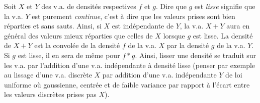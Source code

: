 \begin{eur}[Convolution des densités = addition d'un bruit indépendant sur la v.a.]
  Soit $X$ et $Y$ des v.a. de densités respectives $f$ et $g$.  Dire que $g$
  est \emph{lisse} signifie que la v.a. $Y$ est purement \emph{continue},
  c'est à dire que les valeurs prises sont bien réparties et sans sauts.
  Ainsi, si $X$ est indépendante de $Y$, la v.a. $X+Y$ aura en général des
  valeurs mieux réparties que celles de $X$ lorsque $g$ est lisse.  La densité
  de $X+Y$ est la convolée de la densité $f$ de la v.a. $X$ par la densité $g$
  de la v.a. $Y$.  Si $g$ est lisse, il en sera de même pour $f*g$.  Ainsi,
  lisser une densité se traduit sur les v.a. par l'addition d'une v.a.
  indépendante à densité lisse (penser par exemple au lissage d'une v.a.
  discrète $X$ par addition d'une v.a. indépendante $Y$ de loi uniforme où
  gaussienne, centrée et de faible variance par rapport à l'écart entre les
  valeurs discrètes prises pas $X$).
\end{eur}

